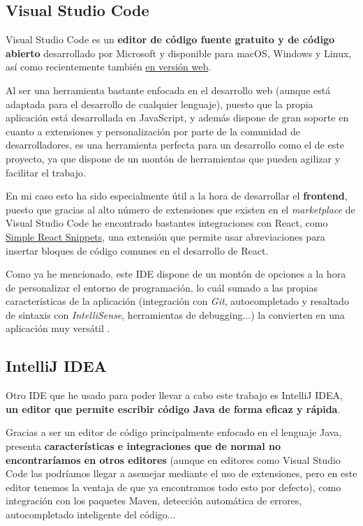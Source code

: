 \subsection{Visual Studio Code}

Visual Studio Code es un \textbf{editor de código fuente gratuito y de código abierto} desarrollado por Microsoft y disponible para macOS, Windows y Linux, así como recientemente también \href{https://vscode.dev}{en versión web}.

Al ser una herramienta bastante enfocada en el desarrollo web (aunque está adaptada para el desarrollo de cualquier lenguaje), puesto que la propia aplicación está desarrollada en JavaScript, y además dispone de gran soporte en cuanto a extensiones y personalización por parte de la comunidad de desarrolladores, es una herramienta perfecta para un desarrollo como el de este proyecto, ya que dispone de un montón de herramientas que pueden agilizar y facilitar el trabajo. 

En mi caso esto ha sido especialmente útil a la hora de desarrollar el \textbf{frontend}, puesto que gracias al alto número de extensiones que existen en el \textit{marketplace} de Visual Studio Code he encontrado bastantes integraciones con React, como \href{https://marketplace.visualstudio.com/items?itemName=burkeholland.simple-react-snippets}{Simple React Snippets}, una extensión que permite usar abreviaciones para insertar bloques de código comunes en el desarrollo de React.

Como ya he mencionado, este IDE dispone de un montón de opciones a la hora de personalizar el entorno de programación, lo cuál sumado a las propias características de la aplicación (integración con \textit{Git}, autocompletado y resaltado de sintaxis con \textit{IntelliSense}, herramientas de debugging...) la convierten en una aplicación muy versátil \cite{vscode:main}.

\subsection{IntelliJ IDEA}

Otro IDE que he usado para poder llevar a cabo este trabajo es IntelliJ IDEA, \textbf{un editor que permite escribir código Java de forma eficaz y rápida}. 

Gracias a ser un editor de código principalmente enfocado en el lenguaje Java, presenta \textbf{características e integraciones que de normal no encontraríamos en otros editores} (aunque en editores como Visual Studio Code las podríamos llegar a asemejar mediante el uso de extensiones, pero en este editor tenemos la ventaja de que ya encontramos todo esto por defecto), como integración con los paquetes Maven, detección automática de errores, autocompletado inteligente del código... \cite{jetbrains:idea}

